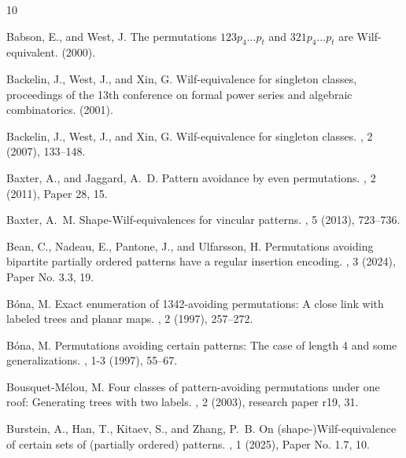 \documentclass[12pt, english, a4paper]{article}
\theoremstyle{plain}
\theoremstyle{definition}
\theoremstyle{remark}
\begin{document}
\begin{thebibliography}{10}

{\sc Babson, E., and West, J.}
\newblock The permutations $123p_4...p_t$ and $321p_4...p_t$ are {W}ilf-equivalent.
 (2000).

{\sc Backelin, J., West, J., and Xin, G.}
\newblock Wilf-equivalence for singleton classes, proceedings of the 13th conference on formal power series and algebraic combinatorics.
 (2001).

{\sc Backelin, J., West, J., and Xin, G.}
\newblock Wilf-equivalence for singleton classes.
, 2 (2007), 133--148.

{\sc Baxter, A., and Jaggard, A.~D.}
\newblock Pattern avoidance by even permutations.
, 2 (2011), Paper 28, 15.

{\sc Baxter, A.~M.}
\newblock Shape-{W}ilf-equivalences for vincular patterns.
, 5 (2013), 723--736.

{\sc Bean, C., Nadeau, E., Pantone, J., and Ulfarsson, H.}
\newblock Permutations avoiding bipartite partially ordered patterns have a regular insertion encoding.
, 3 (2024), Paper No. 3.3, 19.

{\sc B{\'o}na, M.}
\newblock Exact enumeration of 1342-avoiding permutations: {A} close link with labeled trees and planar maps.
, 2 (1997), 257--272.

{\sc B{\'o}na, M.}
\newblock Permutations avoiding certain patterns: {The} case of length 4 and some generalizations.
, 1-3 (1997), 55--67.

{\sc Bousquet-M{\'e}lou, M.}
\newblock Four classes of pattern-avoiding permutations under one roof: {Generating} trees with two labels.
, 2 (2003), research paper r19, 31.

{\sc Burstein, A., Han, T., Kitaev, S., and Zhang, P.~B.}
\newblock On (shape-){W}ilf-equivalence of certain sets of (partially ordered) patterns.
, 1 (2025), Paper No. 1.7, 10.


\end{thebibliography}
\end{document}
